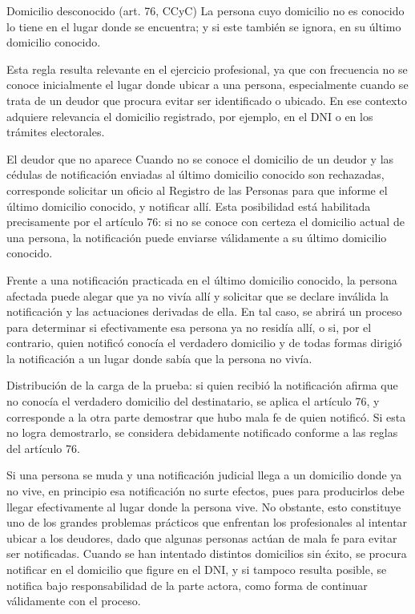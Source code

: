 \documentclass[12pt,oneside]{book}
\begin{document}
\begin{definition}{Domicilio desconocido (art. 76, CCyC)}
La persona cuyo domicilio no es conocido lo tiene en el lugar donde se encuentra; y si este también se ignora, en su último domicilio conocido.
\end{definition}

Esta regla resulta relevante en el ejercicio profesional, ya que con frecuencia no se conoce inicialmente el lugar donde ubicar a una persona, especialmente cuando se trata de un deudor que procura evitar ser identificado o ubicado. En ese contexto adquiere relevancia el domicilio registrado, por ejemplo, en el DNI o en los trámites electorales.

\begin{example}{El deudor que no aparece}
Cuando no se conoce el domicilio de un deudor y las cédulas de notificación enviadas al último domicilio conocido son rechazadas, corresponde solicitar un oficio al Registro de las Personas para que informe el último domicilio conocido, y notificar allí. Esta posibilidad está habilitada precisamente por el artículo 76: si no se conoce con certeza el domicilio actual de una persona, la notificación puede enviarse válidamente a su último domicilio conocido.
\end{example}

Frente a una notificación practicada en el último domicilio conocido, la persona afectada puede alegar que ya no vivía allí y solicitar que se declare inválida la notificación y las actuaciones derivadas de ella. En tal caso, se abrirá un proceso para determinar si efectivamente esa persona ya no residía allí, o si, por el contrario, quien notificó conocía el verdadero domicilio y de todas formas dirigió la notificación a un lugar donde sabía que la persona no vivía.

\begin{important}
Distribución de la carga de la prueba: si quien recibió la notificación afirma que no conocía el verdadero domicilio del destinatario, se aplica el artículo 76, y corresponde a la otra parte demostrar que hubo mala fe de quien notificó. Si esta no logra demostrarlo, se considera debidamente notificado conforme a las reglas del artículo 76.
\end{important}

\begin{note}
Si una persona se muda y una notificación judicial llega a un domicilio donde ya no vive, en principio esa notificación no surte efectos, pues para producirlos debe llegar efectivamente al lugar donde la persona vive. No obstante, esto constituye uno de los grandes problemas prácticos que enfrentan los profesionales al intentar ubicar a los deudores, dado que algunas personas actúan de mala fe para evitar ser notificadas. Cuando se han intentado distintos domicilios sin éxito, se procura notificar en el domicilio que figure en el DNI, y si tampoco resulta posible, se notifica bajo responsabilidad de la parte actora, como forma de continuar válidamente con el proceso.
\end{note}
\end{document}
